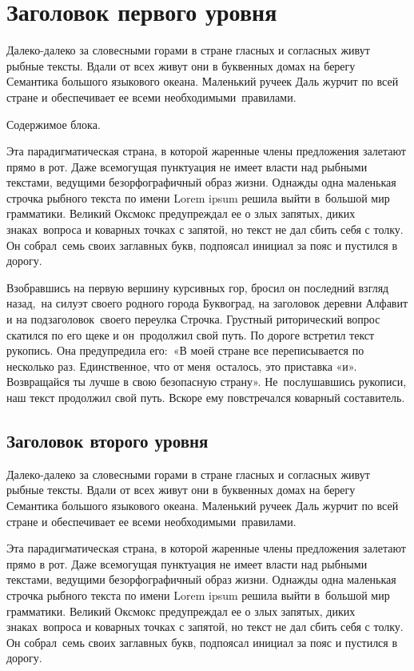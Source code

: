 \documentclass{scrartcl}
\begin{document}
\section{Заголовок первого уровня}
Далеко-далеко за словесными горами в стране гласных и согласных живут рыбные тексты.
Вдали от всех живут они в буквенных домах на берегу Семантика большого языкового океана.
Маленький ручеек Даль журчит по всей стране и обеспечивает ее всеми необходимыми\  
правилами.
\begin{rblock}
    Содержимое блока.
\end{rblock}
Эта парадигматическая страна, в которой жаренные члены предложения залетают прямо в рот.
Даже всемогущая пунктуация не имеет власти над рыбными текстами, ведущими безорфографичный образ жизни.
Однажды одна маленькая строчка рыбного текста по имени Lorem ipsum решила выйти в\ 
большой мир грамматики. Великий Оксмокс предупреждал ее о злых запятых, диких знаках\ 
вопроса и коварных точках с запятой, но текст не дал сбить себя с толку. Он собрал\ 
семь своих заглавных букв, подпоясал инициал за пояс и пустился в дорогу.

Взобравшись на первую вершину курсивных гор, бросил он последний взгляд назад,\ 
на силуэт своего родного города Буквоград, на заголовок деревни Алфавит и на подзаголовок\ 
своего переулка Строчка. Грустный риторический вопрос скатился по его щеке и он\ 
продолжил свой путь. По дороге встретил текст рукопись. Она предупредила его:\ 
«В моей стране все переписывается по несколько раз. Единственное, что от меня\ 
осталось, это приставка «и». Возвращайся ты лучше в свою безопасную страну». Не\ 
послушавшись рукописи, наш текст продолжил свой путь. Вскоре ему повстречался коварный составитель.

\subsection{Заголовок второго уровня}
Далеко-далеко за словесными горами в стране гласных и согласных живут рыбные тексты.
Вдали от всех живут они в буквенных домах на берегу Семантика большого языкового океана.
Маленький ручеек Даль журчит по всей стране и обеспечивает ее всеми необходимыми\  
правилами.

Эта парадигматическая страна, в которой жаренные члены предложения залетают прямо в рот.
Даже всемогущая пунктуация не имеет власти над рыбными текстами, ведущими безорфографичный образ жизни.
Однажды одна маленькая строчка рыбного текста по имени Lorem ipsum решила выйти в\ 
большой мир грамматики. Великий Оксмокс предупреждал ее о злых запятых, диких знаках\ 
вопроса и коварных точках с запятой, но текст не дал сбить себя с толку. Он собрал\ 
семь своих заглавных букв, подпоясал инициал за пояс и пустился в дорогу.
\end{document}
